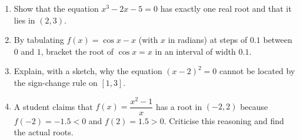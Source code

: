 \documentclass[11pt]{article}
\begin{document}
\begin{exercice}
\begin{enumerate}
\item Show that the equation $x^3 - 2x - 5 = 0$ has exactly one real root and that it lies in $(2, 3)$.
\item By tabulating $f(x) = \cos x - x$ (with $x$ in radians) at steps of $0.1$ between $0$ and $1$, bracket the root of $\cos x = x$ in an interval of width $0.1$.
\item Explain, with a sketch, why the equation $(x-2)^2 = 0$ cannot be located by the sign-change rule on $[1, 3]$.
\item A student claims that $f(x) = \dfrac{x^2 - 1}{x}$ has a root in $(-2, 2)$ because $f(-2) = -1.5 < 0$ and $f(2) = 1.5 > 0$. Criticise this reasoning and find the actual roots.
\end{enumerate}
\end{exercice}
\end{document}
